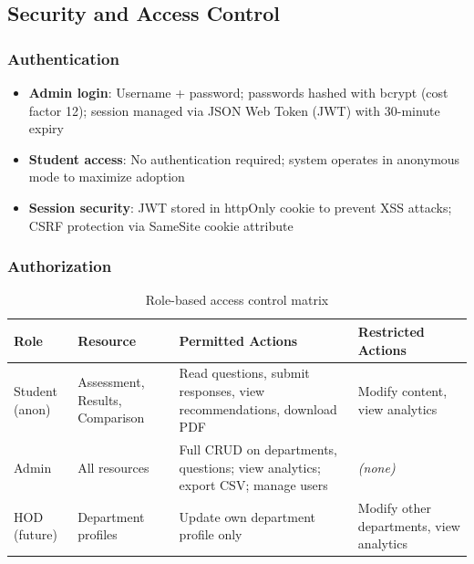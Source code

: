 ﻿\documentclass[12pt, a4paper]{article}
\newcommand{\theadrow}{\rowcolor{tableheader}}
\newcommand{\rowalt}{\rowcolor{tablerowalt}}
\begin{document}
\subsection{Security and Access Control}

\subsubsection*{Authentication}

\begin{itemize}[leftmargin=1.5em, itemsep=3pt]
    \item \textbf{Admin login}: Username + password; passwords hashed with bcrypt (cost factor 12); session managed via JSON Web Token (JWT) with 30-minute expiry
    \item \textbf{Student access}: No authentication required; system operates in anonymous mode to maximize adoption
    \item \textbf{Session security}: JWT stored in httpOnly cookie to prevent XSS attacks; CSRF protection via SameSite cookie attribute
\end{itemize}

\subsubsection*{Authorization}

\begin{table}[H]
\centering
\small
\begin{tabularx}{\textwidth}{>{\raggedright\arraybackslash}p{2.8cm}>{\raggedright\arraybackslash}p{3.2cm}>{\raggedright\arraybackslash}X>{\raggedright\arraybackslash}p{3.5cm}}
\toprule
\theadrow
\textbf{Role} & \textbf{Resource} & \textbf{Permitted Actions} & \textbf{Restricted Actions} \\
\midrule
Student (anon) & Assessment, Results, Comparison & Read questions, submit responses, view recommendations, download PDF & Modify content, view analytics \\[6pt]
\rowalt
Admin          & All resources & Full CRUD on departments, questions; view analytics; export CSV; manage users & \textit{(none)} \\[6pt]
HOD (future)   & Department profiles & Update own department profile only & Modify other departments, view analytics \\[6pt]
\bottomrule
\end{tabularx}
\caption{Role-based access control matrix}
\label{tab:rbac}
\end{table}
\end{document}
